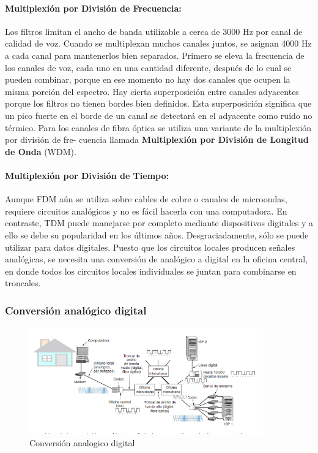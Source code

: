 \paragraph{Multiplexión por División de Frecuencia:} Los filtros limitan el ancho de banda utilizable a cerca de 3000 Hz por canal de calidad de voz. Cuando se multiplexan muchos canales juntos, se asignan 4000 Hz a cada canal para mantenerlos bien separados. Primero se eleva la frecuencia de los canales de voz, cada uno en una cantidad diferente, después de lo cual se pueden combinar, porque en ese momento no hay dos canales que ocupen la misma porción del espectro. Hay cierta superposición entre canales adyacentes porque los filtros no tienen bordes bien definidos. Esta superposición significa que un pico fuerte en el borde de un canal se detectará en el adyacente como ruido no térmico. Para los canales de fibra óptica se utiliza una variante de la multiplexión por división de fre-
cuencia llamada \textbf{Multiplexión por División de Longitud de Onda} (WDM).

\paragraph{Multiplexión por División de Tiempo:} Aunque FDM aún se utiliza sobre cables de cobre o canales de microondas, requiere circuitos analógicos y no es fácil hacerla con una computadora. En contraste, TDM puede manejarse por completo mediante dispositivos digitales y a ello se debe su popularidad en los últimos años. Desgraciadamente, sólo se puede utilizar para datos digitales. Puesto que los circuitos locales producen señales analógicas, se necesita una conversión de analógico a digital en la oficina central, en donde todos los circuitos locales individuales se juntan para combinarse en troncales.

\subsubsection{Conversión analógico digital}
\begin{figure}[H]
	\centering
	\includegraphics[width=0.9\textwidth
]{images/conversion-analogico-digital.png}
	\caption[Conversión analogico digital]{Conversión analogico digital}
	\label{fig:conversion-analogico-digital}
\end{figure}
